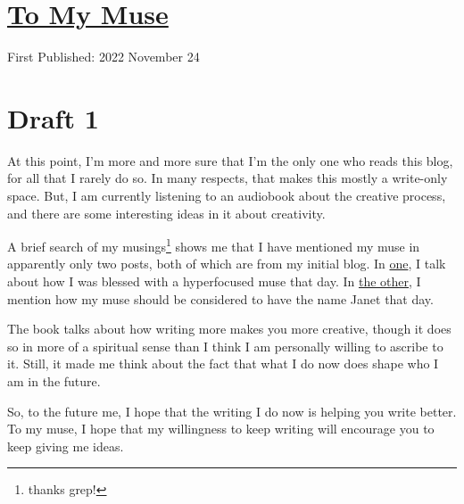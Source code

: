 \documentclass[12pt]{article}[titlepage]
\newcommand{\1}{\={a}}
\newcommand{\2}{\={e}}
\newcommand{\3}{\={\i}}
\newcommand{\4}{\=o}
\newcommand{\5}{\=u}
\newcommand{\6}{\={A}}
\renewcommand{\,}{\textsuperscript{,}}
\begin{document}
\doublespacing
\section{\href{muse.html}{To My Muse}}
First Published: 2022 November 24

\section{Draft 1}
At this point, I'm more and more sure that I'm the only one who reads this blog, for all that I rarely do so.
In many respects, that makes this mostly a write-only space.
But, I am currently listening to an audiobook about the creative process, and there are some interesting ideas in it about creativity.

A brief search of my musings\footnote{thanks grep!} shows me that I have mentioned my muse in apparently only two posts, both of which are from my initial blog.
In \href{arranging-for-bagpipes-ii.html}{one}, I talk about how I was blessed with a hyperfocused muse that day.
In \href{making-a-mixtape.html}{the other}, I mention how my muse should be considered to have the name Janet that day.

The book talks about how writing more makes you more creative, though it does so in more of a spiritual sense than I think I am personally willing to ascribe to it.
Still, it made me think about the fact that what I do now does shape who I am in the future.

So, to the future me, I hope that the writing I do now is helping you write better.
To my muse, I hope that my willingness to keep writing will encourage you to keep giving me ideas.
\end{document}

